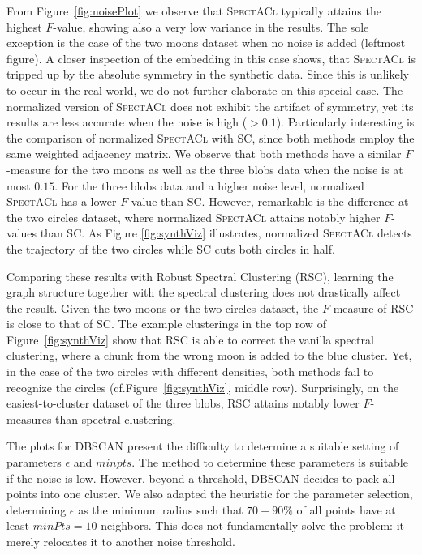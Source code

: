 From Figure~\ref{fig:noisePlot} we observe that \textsc{SpectACl} typically attains the highest $F$-value, showing also a very low variance in the results. The sole exception is the case of the two moons dataset when no noise is added (leftmost figure). A closer inspection of the embedding in this case shows, that \textsc{SpectACl} is tripped up by the absolute symmetry in the synthetic data. Since this is unlikely to occur in the real world, we do not further elaborate on this special case. 
The normalized version of \textsc{SpectACl} does not exhibit the artifact of symmetry, yet its results are less accurate when the noise is high ($>0.1$). Particularly interesting is the comparison of normalized \textsc{SpectACl} with \textsc{SC}, since both methods employ the same weighted adjacency matrix. We observe that both methods have a similar $F$-measure for the two moons as well as the three blobs data when the noise is at most $0.15$. For the three blobs data and a higher noise level, normalized \textsc{SpectACl} has a lower $F$-value than \textsc{SC}. However, remarkable is the difference at the two circles dataset, where  normalized \textsc{SpectACl} attains notably higher $F$-values than \textsc{SC}. As Figure \ref{fig:synthViz} illustrates, normalized \textsc{SpectACl} detects the trajectory of the two circles while \textsc{SC} cuts both circles in half. 

Comparing these results with Robust Spectral Clustering (\textsc{RSC}), learning the graph structure together with the spectral clustering does not drastically affect the result. Given the two moons or the two circles dataset, the $F$-measure of \textsc{RSC} is close to that of \textsc{SC}. The example clusterings in the top row of Figure~\ref{fig:synthViz} show that \textsc{RSC} is able to correct the vanilla spectral clustering, where a chunk from the wrong moon is added to the blue cluster. Yet, in the case of the two circles with different densities, both methods fail to recognize the circles (cf.\@ Figure~\ref{fig:synthViz}, middle row). Surprisingly, on the easiest-to-cluster dataset of the three blobs, \textsc{RSC} attains notably lower $F$-measures than spectral clustering.

The plots for DBSCAN present the difficulty to determine a suitable setting of parameters $\epsilon$ and $minpts$. The method to determine these parameters is suitable if the noise is low. However, beyond a threshold, DBSCAN decides to pack all points into one cluster. We also adapted the heuristic for the parameter selection, determining $\epsilon$ as the minimum radius such that $70-90\%$ of all points have at least $minPts=10$ neighbors. This does not fundamentally solve the problem: it merely relocates it to another noise threshold.
